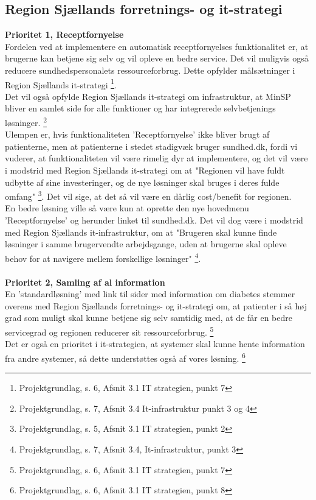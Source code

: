 \subsection{Region Sjællands forretnings- og it-strategi}
\textbf{Prioritet 1, Receptfornyelse}\\
Fordelen ved at implementere en automatisk receptfornyelses funktionalitet er, at brugerne kan betjene sig selv og vil opleve en bedre service. Det vil muligvis også reducere sundhedspersonalets ressourceforbrug. Dette opfylder målsætninger i Region Sjællands it-strategi \footnote{Projektgrundlag, s. 6, Afsnit 3.1 IT strategien, punkt 7 }.\\
Det vil også opfylde Region Sjællands it-strategi om infrastruktur, at MinSP bliver en samlet side for alle funktioner og har integrerede selvbetjenings løsninger. \footnote{Projektgrundlag, s. 7, Afsnit 3.4 It-infrastruktur punkt 3 og 4}\\
Ulempen er, hvis funktionaliteten 'Receptfornyelse' ikke bliver brugt af patienterne, men at patienterne i stedet stadigvæk bruger sundhed.dk, fordi vi vuderer, at funktionaliteten vil være rimelig dyr at implementere, og det vil være i modstrid med Region Sjællands it-strategi om at "Regionen vil have fuldt udbytte af sine investeringer, og de nye løsninger skal bruges i deres fulde omfang" \footnote{Projektgrundlag, s. 5, Afsnit 3.1 IT strategien, punkt 2}. Det vil sige, at det så vil være en dårlig cost/benefit for regionen.\\ 
En bedre løsning ville så være kun at oprette den nye hovedmenu 'Receptfornyelse' og herunder linket til sundhed.dk. Det vil dog være i modstrid med Region Sjællands it-infrastruktur, om at "Brugeren skal kunne finde løsninger i samme brugervendte arbejdsgange, uden at brugerne skal opleve behov for at navigere mellem forskellige løsninger" \footnote{Projektgrundlag, s. 7, Afsnit 3.4, It-infrastruktur, punkt 3}. 
\\\\
\textbf{Prioritet 2, Samling af al information}\\
En 'standardløsning' med link til sider med information om diabetes stemmer overens med Region Sjællands forretnings- og it-strategi om, at patienter i så høj grad som muligt skal kunne betjene sig selv samtidig med, at de får en bedre servicegrad og regionen reducerer sit ressourceforbrug. \footnote{Projektgrundlag, s. 6, Afsnit 3.1 IT strategien, punkt 7} \\
Det er også en prioritet i it-strategien, at systemer skal kunne hente information fra andre systemer, så dette understøttes også af vores løsning. \footnote{Projektgrundlag, s. 6, Afsnit 3.1 IT strategien, punkt 8} \\
